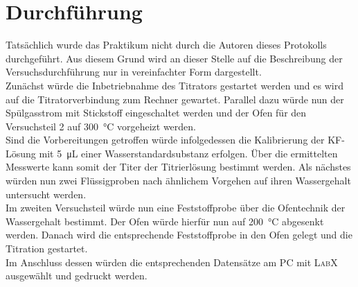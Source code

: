 \section{Durchführung}
\label{sec:durchfuerung}
Tatsächlich wurde das Praktikum nicht durch die Autoren dieses Protokolls durchgeführt. Aus diesem Grund wird an dieser Stelle auf die Beschreibung der Versuchsdurchführung nur in vereinfachter Form dargestellt.\\
Zunächst würde die Inbetriebnahme des Titrators gestartet werden und es wird auf die Titratorverbindung zum Rechner gewartet. Parallel dazu würde nun der Spülgasstrom mit Stickstoff eingeschaltet werden und der Ofen für den Versuchsteil 2 auf \SI{300}{\celsius} vorgeheizt werden. \\
Sind die Vorbereitungen getroffen würde infolgedessen die Kalibrierung der KF-Lösung mit \SI{5}{\micro \liter} einer Wasserstandardsubstanz erfolgen. Über die ermittelten Messwerte kann somit der Titer der Titrierlösung bestimmt werden.
Als nächstes würden nun zwei Flüssigproben nach ähnlichem Vorgehen auf ihren Wassergehalt untersucht werden.\\
Im zweiten Versuchsteil würde nun eine Feststoffprobe über die Ofentechnik der Wassergehalt bestimmt. Der Ofen würde hierfür nun auf \SI{200}{\celsius} abgesenkt werden. Danach wird die entsprechende Feststoffprobe in den Ofen gelegt und die Titration gestartet.\\
Im Anschluss dessen würden die entsprechenden Datensätze am PC mit \textsc{LabX} ausgewählt und gedruckt werden.